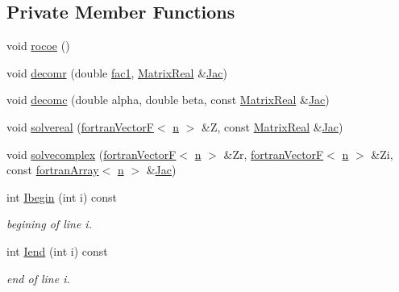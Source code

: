 \subsection*{Private Member Functions}
\begin{DoxyCompactItemize}
\item 
void \hyperlink{classodes_1_1Rodascc_a546279a3df600cb4d97e9305de4c7c70}{rocoe} ()
\item 
void \hyperlink{classodes_1_1Matrices_a8dc1bc6d92d06af08d4bf8fb2b357a7d}{decomr} (double \hyperlink{classodes_1_1Rodascc_ab79d02557207039250e99fa7ccaf5183}{fac1}, \hyperlink{classodes_1_1Rodascc_a60e15e5d87729cc221d2181ecf03d0f8}{Matrix\-Real} \&\hyperlink{classodes_1_1Rodascc_af07528efa60ce583012e64ce98b9a404}{Jac})
\item 
void \hyperlink{classodes_1_1Matrices_a9f497885fb6dd9bb22179fab49d9b587}{decomc} (double alpha, double beta, const \hyperlink{classodes_1_1Rodascc_a60e15e5d87729cc221d2181ecf03d0f8}{Matrix\-Real} \&\hyperlink{classodes_1_1Rodascc_af07528efa60ce583012e64ce98b9a404}{Jac})
\item 
void \hyperlink{classodes_1_1Matrices_ace113b7bfa2377d513c2faaf645aecaa}{solvereal} (\hyperlink{classodes_1_1fortranVectorF}{fortran\-Vector\-F}$<$ \hyperlink{classodes_1_1Rodascc_a7a4cb0d10f0154fed837031863bb491d}{n} $>$ \&Z, const \hyperlink{classodes_1_1Rodascc_a60e15e5d87729cc221d2181ecf03d0f8}{Matrix\-Real} \&\hyperlink{classodes_1_1Rodascc_af07528efa60ce583012e64ce98b9a404}{Jac})
\item 
void \hyperlink{classodes_1_1Matrices_abce8558c305de75740568ec55e49338e}{solvecomplex} (\hyperlink{classodes_1_1fortranVectorF}{fortran\-Vector\-F}$<$ \hyperlink{classodes_1_1Rodascc_a7a4cb0d10f0154fed837031863bb491d}{n} $>$ \&Zr, \hyperlink{classodes_1_1fortranVectorF}{fortran\-Vector\-F}$<$ \hyperlink{classodes_1_1Rodascc_a7a4cb0d10f0154fed837031863bb491d}{n} $>$ \&Zi, const \hyperlink{classodes_1_1fortranArray}{fortran\-Array}$<$ \hyperlink{classodes_1_1Rodascc_a7a4cb0d10f0154fed837031863bb491d}{n} $>$ \&\hyperlink{classodes_1_1Rodascc_af07528efa60ce583012e64ce98b9a404}{Jac})
\item 
int \hyperlink{classodes_1_1Matrices_a9eb26d713d3e391f60d83798337d87a6}{Ibegin} (int i) const
\begin{DoxyCompactList}\small\item\em begining of line i. \end{DoxyCompactList}\item 
int \hyperlink{classodes_1_1Matrices_a589402cfa0e11666cd152a06e048c6f7}{Iend} (int i) const
\begin{DoxyCompactList}\small\item\em end of line i. \end{DoxyCompactList}\end{DoxyCompactItemize}
